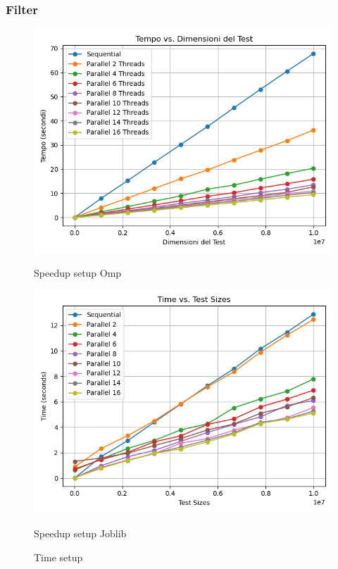 \documentclass[11pt]{article}
\begin{document}
    \subsubsection{Filter}\label{subsubsec:fpr-010-filter}
    \begin{figure}[H]
        \centering
        \includegraphics[width=\linewidth]{omp/010/filter_time_plot}
            \caption{Speedup setup Omp}\label{fig:010-filter_time_omp}
        \endminipage\hfill
        \includegraphics[width=\linewidth]{joblib/010/filter_time_plot}
            \caption{Speedup setup Joblib}\label{fig:010-filter_time_joblib}
        \endminipage\hfill
        \caption{Time setup}
    \end{figure}
\end{document}
